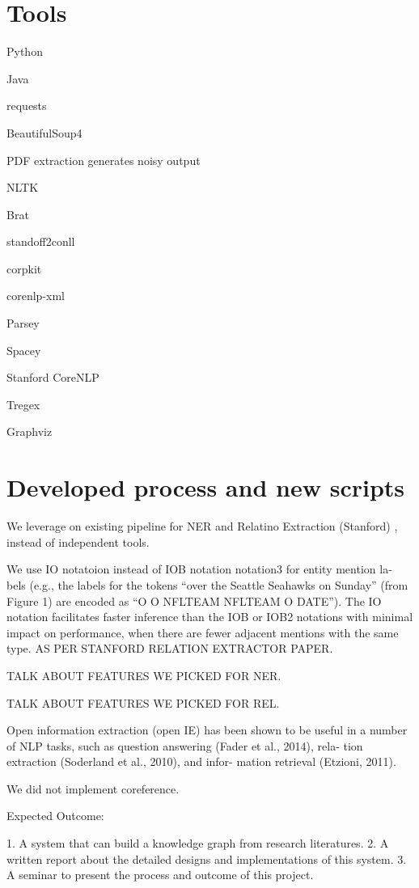 \documentclass[11pt,a4paper,openright]{memoir}
\begin{document}
\section{Tools}

Python

Java

requests

BeautifulSoup4

PDF extraction generates noisy output

NLTK

Brat

standoff2conll

corpkit

corenlp-xml

Parsey

Spacey

Stanford CoreNLP

Tregex

Graphviz

\section{Developed process and new scripts}

We leverage on existing pipeline for NER and Relatino Extraction (Stanford) , instead of independent tools.

We use IO notatoion instead of IOB notation  notation3 for entity mention la- bels (e.g., the labels for the tokens “over the Seattle Seahawks on Sunday” (from Figure 1) are encoded as “O O NFLTEAM NFLTEAM O DATE”). The IO notation facilitates faster inference than the IOB or IOB2 notations with minimal impact on performance, when there are fewer adjacent mentions with the same type. AS PER STANFORD RELATION EXTRACTOR PAPER.

TALK ABOUT FEATURES WE PICKED FOR NER.

TALK ABOUT FEATURES WE PICKED FOR REL.

Open information extraction (open IE) has been shown to be useful in a number of NLP tasks, such as question answering (Fader et al., 2014), rela- tion extraction (Soderland et al., 2010), and infor- mation retrieval (Etzioni, 2011).

We did not implement coreference.

Expected Outcome:

1. A system that can build a knowledge graph from research literatures.  
2. A written report about the detailed designs and implementations of this system.
3. A seminar to present the process and outcome of this project.
\end{document}
